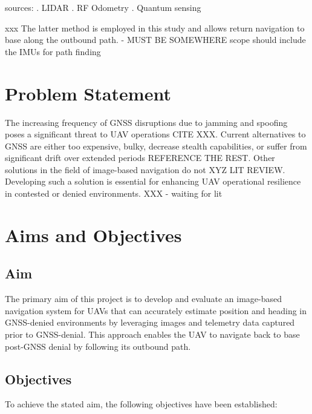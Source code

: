 sources:
\cite{scoutaerial2024lidar}. LIDAR
\cite{brewer_line_2024}. RF
\cite{Zhuang2023} Odometry
\cite{wright2022cold}.  Quantum sensing


 xxx
The latter method is employed in this study and allows return navigation to base along the outbound path.  - MUST BE SOMEWHERE 
scope should include the IMUs for path finding


\section{Problem Statement}
The increasing frequency of GNSS disruptions due to jamming and spoofing poses a significant threat to UAV operations {CITE XXX}. Current alternatives to GNSS are either too expensive, bulky, decrease stealth capabilities, or suffer from significant drift over extended periods \cite{wright2022cold} {REFERENCE THE REST}. Other solutions in the field of image-based navigation do not XYZ {LIT REVIEW}. Developing such a solution is essential for enhancing UAV operational resilience in contested or denied environments. 
XXX - waiting for lit

\section{Aims and Objectives}
\subsection{Aim}

The primary aim of this project is to develop and evaluate an image-based navigation system for UAVs that can accurately estimate position and heading in GNSS-denied environments by leveraging images and telemetry data captured prior to GNSS-denial. This approach enables the UAV to navigate back to base post-GNSS denial by following its outbound path.

\subsection{Objectives}

To achieve the stated aim, the following objectives have been established:

